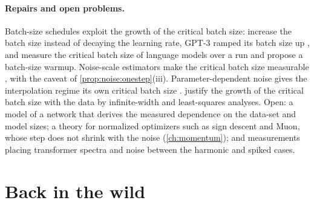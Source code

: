 \begin{refsection}
\paragraph{Repairs and open problems.} Batch-size schedules exploit the growth of the critical batch size: \textcite{SmithEtAl2018} increase the batch size instead of decaying the learning rate, GPT-3 ramped its batch size up \parencite{BrownEtAl2020}, and \textcite{MerrillEtAl2025} measure the critical batch size of language models over a run and propose a batch-size warmup. Noise-scale estimators make the critical batch size measurable \parencite{McCandlishEtAl2018}, with the caveat of \cref{prop:noise:onestep}(iii). Parameter-dependent noise gives the interpolation regime its own critical batch size \parencite{MaBassilyBelkin2018,JainEtAl2018}. \Textcite{ZhangEtAl2025CBS} justify the growth of the critical batch size with the data by infinite-width and least-squares analyses. Open: a model of a network that derives the measured dependence on the data-set and model sizes; a theory for normalized optimizers such as sign descent and Muon, whose step does not shrink with the noise (\cref{ch:momentum}); and measurements placing transformer spectra and noise between the harmonic and spiked cases.

\section{Back in the wild}\label{sec:noise:back}


\end{refsection}
